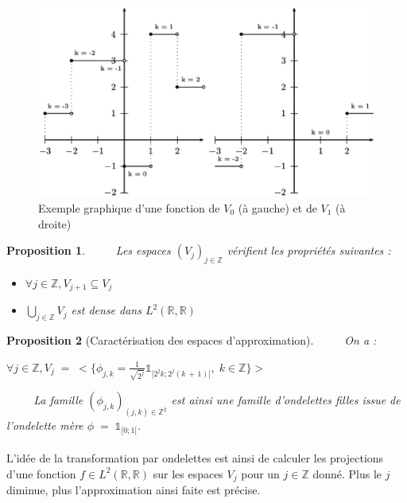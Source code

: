 \documentclass[a4paper,10pt]{report}
\theoremstyle{break}
\newtheorem{Prop}{Proposition}
\begin{document}
      \begin{figure}[!h]
	\centering
	\includegraphics[width = 0.7 \linewidth]{espaces.eps}
	\caption{Exemple graphique d'une fonction de $V_0$ (\`{a} gauche) et de $V_1$ (\`{a} droite)}
      \end{figure}
      
\newpage
	      
      \begin{Prop}
	$\phantom{Prop}$ Les espaces $(V_j)_{j \in \mathbb{Z}}$ v\'{e}rifient les propri\'{e}t\'{e}s suivantes \cite{comp} :
	\begin{itemize}
	  \item[$(i)$] $ \forall j \in \mathbb{Z}, V_{j + 1} \subseteq V_j $
	  \item[$(ii)$] $ \displaystyle \bigcup_{j \in \mathbb{Z}} V_j $ est dense dans $ L^2(\mathbb{R}, \mathbb{R}) $
	\end{itemize}
      \end{Prop}
	  
    \begin{Prop}[Caract\'{e}risation des espaces d'approximation]
	  $\phantom{Prop}$ On a : 
	  
	  \begin{center}
	  $ \forall j \in \mathbb{Z}, V_j \; = \; 
	  \Bigg< \Big\{ \phi_{j,k} = \frac{1}{\sqrt{2^j}} \mathbb{1}_{[2^j k; 2^j (k \, + \, 1)[}, \; k \in \mathbb{Z} \Big\} \Bigg> $ 
	  \end{center}
	  
	  $\phantom{Prop}$ La famille $ (\phi_{j, k})_{(j, k) \in \mathbb{Z}^2} $ est ainsi une famille d'ondelettes filles issue de l'ondelette
	    m\`{e}re $ \phi \; = \; \mathbb{1}_{[0 ; 1[} $.
    \end{Prop}
	    
    \paragraph{} L'id\'{e}e de la transformation par ondelettes est ainsi de calculer les projections d'une fonction
	$ f \in L^2(\mathbb{R}, \mathbb{R}) $ sur les espaces $ V_j $ pour un $ j \in \mathbb{Z} $ donn\'{e}.
	Plus le $ j $ diminue, plus l'approximation ainsi faite est pr\'{e}cise.
	
\end{document}
